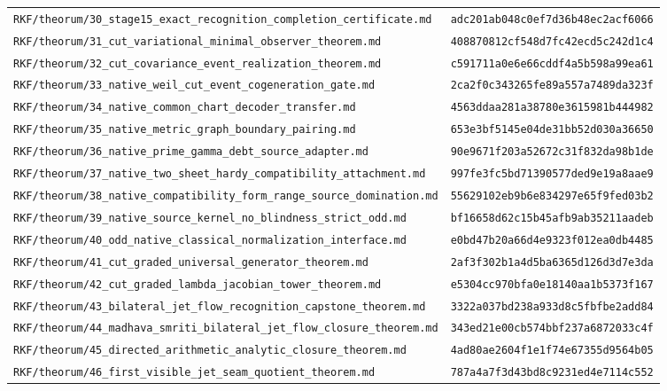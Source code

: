 \documentclass[11pt,openany]{book}
\begin{document}
\begin{small}
\begin{longtable}{p{}p{}}
\texttt{RKF/theorum/30\_stage15\_exact\_recognition\_completion\_certificate.md} & \texttt{adc201ab048c0ef7d36b48ec2acf6066}\\
\texttt{RKF/theorum/31\_cut\_variational\_minimal\_observer\_theorem.md} & \texttt{408870812cf548d7fc42ecd5c242d1c4}\\
\texttt{RKF/theorum/32\_cut\_covariance\_event\_realization\_theorem.md} & \texttt{c591711a0e6e66cddf4a5b598a99ea61}\\
\texttt{RKF/theorum/33\_native\_weil\_cut\_event\_cogeneration\_gate.md} & \texttt{2ca2f0c343265fe89a557a7489da323f}\\
\texttt{RKF/theorum/34\_native\_common\_chart\_decoder\_transfer.md} & \texttt{4563ddaa281a38780e3615981b444982}\\
\texttt{RKF/theorum/35\_native\_metric\_graph\_boundary\_pairing.md} & \texttt{653e3bf5145e04de31bb52d030a36650}\\
\texttt{RKF/theorum/36\_native\_prime\_gamma\_debt\_source\_adapter.md} & \texttt{90e9671f203a52672c31f832da98b1de}\\
\texttt{RKF/theorum/37\_native\_two\_sheet\_hardy\_compatibility\_attachment.md} & \texttt{997fe3fc5bd71390577ded9e19a8aae9}\\
\texttt{RKF/theorum/38\_native\_compatibility\_form\_range\_source\_domination.md} & \texttt{55629102eb9b6e834297e65f9fed03b2}\\
\texttt{RKF/theorum/39\_native\_source\_kernel\_no\_blindness\_strict\_odd.md} & \texttt{bf16658d62c15b45afb9ab35211aadeb}\\
\texttt{RKF/theorum/40\_odd\_native\_classical\_normalization\_interface.md} & \texttt{e0bd47b20a66d4e9323f012ea0db4485}\\
\texttt{RKF/theorum/41\_cut\_graded\_universal\_generator\_theorem.md} & \texttt{2af3f302b1a4d5ba6365d126d3d7e3da}\\
\texttt{RKF/theorum/42\_cut\_graded\_lambda\_jacobian\_tower\_theorem.md} & \texttt{e5304cc970bfa0e18140aa1b5373f167}\\
\texttt{RKF/theorum/43\_bilateral\_jet\_flow\_recognition\_capstone\_theorem.md} & \texttt{3322a037bd238a933d8c5fbfbe2add84}\\
\texttt{RKF/theorum/44\_madhava\_smriti\_bilateral\_jet\_flow\_closure\_theorem.md} & \texttt{343ed21e00cb574bbf237a6872033c4f}\\
\texttt{RKF/theorum/45\_directed\_arithmetic\_analytic\_closure\_theorem.md} & \texttt{4ad80ae2604f1e1f74e67355d9564b05}\\
\texttt{RKF/theorum/46\_first\_visible\_jet\_seam\_quotient\_theorem.md} & \texttt{787a4a7f3d43bd8c9231ed4e7114c552}\\

\end{longtable}
\end{small}
\end{document}
